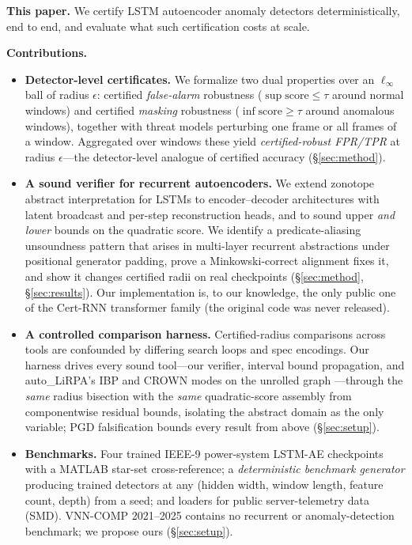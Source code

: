 \documentclass{article} %
\newcommand{\score}{\mathrm{score}}
\begin{document}
\textbf{This paper.} We certify LSTM autoencoder anomaly detectors
deterministically, end to end, and evaluate what such certification
costs at scale.

\textbf{Contributions.}
\begin{itemize}
\item \textbf{Detector-level certificates.} We formalize two dual
  properties over an $\ell_\infty$ ball of radius $\epsilon$: certified
  \emph{false-alarm} robustness ($\sup \score \le \tau$ around normal
  windows) and certified \emph{masking} robustness
  ($\inf \score \ge \tau$ around anomalous windows), together with
  threat models perturbing one frame or all frames of a window.
  Aggregated over windows these yield \emph{certified-robust FPR/TPR}
  at radius $\epsilon$---the detector-level analogue of certified
  accuracy (\S\ref{sec:method}).
\item \textbf{A sound verifier for recurrent autoencoders.} We extend
  zonotope abstract interpretation for LSTMs
  \citep{du2021certrnn} to encoder--decoder architectures with
  latent broadcast and per-step reconstruction heads, and to sound
  upper \emph{and lower} bounds on the quadratic score. We identify a
  predicate-aliasing unsoundness pattern that arises in multi-layer
  recurrent abstractions under positional generator padding, prove a
  Minkowski-correct alignment fixes it, and show it changes certified
  radii on real checkpoints (\S\ref{sec:method}, \S\ref{sec:results}).
  Our implementation is, to our knowledge, the only public one of the
  Cert-RNN transformer family (the original code was never released).
\item \textbf{A controlled comparison harness.} Certified-radius
  comparisons across tools are confounded by differing search loops and
  spec encodings. Our harness drives every sound tool---our verifier,
  interval bound propagation, and auto\_LiRPA's IBP and CROWN modes on
  the unrolled graph \citep{xu2020automatic}---through the
  \emph{same} radius bisection with the \emph{same} quadratic-score
  assembly from componentwise residual bounds, isolating the abstract
  domain as the only variable; PGD falsification bounds every result
  from above (\S\ref{sec:setup}).
\item \textbf{Benchmarks.} Four trained IEEE-9 power-system LSTM-AE
  checkpoints with a MATLAB star-set cross-reference; a
  \emph{deterministic benchmark generator} producing trained detectors
  at any (hidden width, window length, feature count, depth) from a
  seed; and loaders for public server-telemetry data (SMD). VNN-COMP
  2021--2025 contains no recurrent or anomaly-detection benchmark; we
  propose ours (\S\ref{sec:setup}).
\end{itemize}
\end{document}
